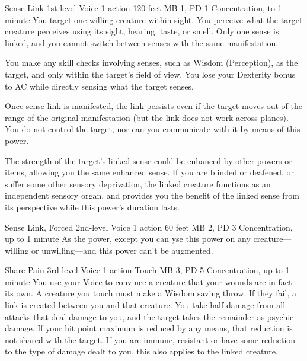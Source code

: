 \DndPowerHeader%
  {Sense Link}
  {1st-level Voice}
  {1 action}
  {120 feet}
  {MB 1, PD 1}
  {Concentration, to 1 minute}
  You target one willing creature within sight.
  You perceive what the target creature perceives using its sight,
  hearing, taste, or smell.
  Only one sense is linked,
  and you cannot switch between senses with the same manifestation.

  You make any skill checks involving senses,
  such as Wisdom (Perception), as the target,
  and only within the target's field of view.
  You lose your Dexterity bonus to AC while
  directly sensing what the target senses.
  
  Once sense link is manifested, the link persists
  even if the target moves out of the range
  of the original manifestation
  (but the link does not work across planes).
  You do not control the target,
  nor can you communicate with it by means of this power.
  
  The strength of the target's linked sense could be enhanced
  by other powers or items,
  allowing you the same enhanced sense.
  If you are blinded or deafened, or suffer some other sensory deprivation,
  the linked creature functions as an independent sensory organ,
  and provides you the benefit of the linked sense from its perspective
  while this power's duration lasts.

\DndPowerHeader%
  {Sense Link, Forced}
  {2nd-level Voice}
  {1 action}
  {60 feet}
  {MB 2, PD 3}
  {Concentration, up to 1 minute}
As the  power,
except you can yse this power on any creature---willing or
unwilling---and this power can't be augmented.

\DndPowerHeader%
  {Share Pain}
  {3rd-level Voice}
  {1 action}
  {Touch}
  {MB 3, PD 5}
  {Concentration, up to 1 minute}
  You use your Voice to convince a creature that your wounds are
  in fact its own.
  A creature you touch must make a Wisdom saving throw.
  If they fail, a link is created between you and that creature.
  You take half damage from all attacks that deal damage to you,
  and the target takes the remainder as psychic damage.
  If your hit point maximum is reduced by any means,
  that reduction is not shared with the target.
  If you are immune, resistant or have some reduction
  to the type of damage dealt to you,
  this also applies to the linked creature. 
  

